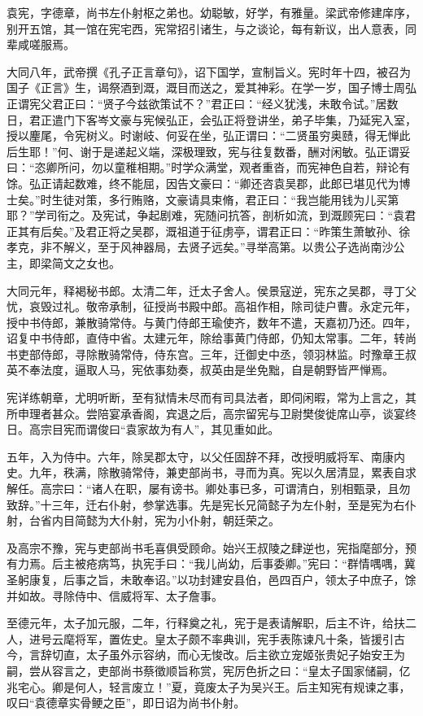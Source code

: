 \documentclass[]{article}
\begin{document}
袁宪，字德章，尚书左仆射枢之弟也。幼聪敏，好学，有雅量。梁武帝修建庠序，别开五馆，其一馆在宪宅西，宪常招引诸生，与之谈论，每有新议，出人意表，同辈咸嗟服焉。

大同八年，武帝撰《孔子正言章句》，诏下国学，宣制旨义。宪时年十四，被召为国子《正言》生，谒祭酒到溉，溉目而送之，爱其神彩。在学一岁，国子博士周弘正谓宪父君正曰：``贤子今兹欲策试不？''君正曰：``经义犹浅，未敢令试。''居数日，君正遣门下客岑文豪与宪候弘正，会弘正将登讲坐，弟子毕集，乃延宪入室，授以麈尾，令宪树义。时谢岐、何妥在坐，弘正谓曰：``二贤虽穷奥赜，得无惮此后生耶！''何、谢于是递起义端，深极理致，宪与往复数番，酬对闲敏。弘正谓妥曰：``恣卿所问，勿以童稚相期。''时学众满堂，观者重沓，而宪神色自若，辩论有馀。弘正请起数难，终不能屈，因告文豪曰：``卿还咨袁吴郡，此郎已堪见代为博士矣。''时生徒对策，多行贿赂，文豪请具束脩，君正曰：``我岂能用钱为儿买第耶？''学司衔之。及宪试，争起剧难，宪随问抗答，剖析如流，到溉顾宪曰：``袁君正其有后矣。''及君正将之吴郡，溉祖道于征虏亭，谓君正曰：``昨策生萧敏孙、徐孝克，非不解义，至于风神器局，去贤子远矣。''寻举高第。以贵公子选尚南沙公主，即梁简文之女也。

大同元年，释褐秘书郎。太清二年，迁太子舍人。侯景寇逆，宪东之吴郡，寻丁父忧，哀毁过礼。敬帝承制，征授尚书殿中郎。高祖作相，除司徒户曹。永定元年，授中书侍郎，兼散骑常侍。与黄门侍郎王瑜使齐，数年不遣，天嘉初乃还。四年，诏复中书侍郎，直侍中省。太建元年，除给事黄门侍郎，仍知太常事。二年，转尚书吏部侍郎，寻除散骑常侍，侍东宫。三年，迁御史中丞，领羽林监。时豫章王叔英不奉法度，逼取人马，宪依事劾奏，叔英由是坐免黜，自是朝野皆严惮焉。

宪详练朝章，尤明听断，至有狱情未尽而有司具法者，即伺闲暇，常为上言之，其所申理者甚众。尝陪宴承香阁，宾退之后，高宗留宪与卫尉樊俊徙席山亭，谈宴终日。高宗目宪而谓俊曰``袁家故为有人''，其见重如此。

五年，入为侍中。六年，除吴郡太守，以父任固辞不拜，改授明威将军、南康内史。九年，秩满，除散骑常侍，兼吏部尚书，寻而为真。宪以久居清显，累表自求解任。高宗曰：``诸人在职，屡有谤书。卿处事已多，可谓清白，别相甄录，且勿致辞。''十三年，迁右仆射，参掌选事。先是宪长兄简懿子为左仆射，至是宪为右仆射，台省内目简懿为大仆射，宪为小仆射，朝廷荣之。

及高宗不豫，宪与吏部尚书毛喜俱受顾命。始兴王叔陵之肆逆也，宪指麾部分，预有力焉。后主被疮病笃，执宪手曰：``我儿尚幼，后事委卿。''宪曰：``群情喁喁，冀圣躬康复，后事之旨，未敢奉诏。''以功封建安县伯，邑四百户，领太子中庶子，馀并如故。寻除侍中、信威将军、太子詹事。

至德元年，太子加元服，二年，行释奠之礼，宪于是表请解职，后主不许，给扶二人，进号云麾将军，置佐史。皇太子颇不率典训，宪手表陈谏凡十条，皆援引古今，言辞切直，太子虽外示容纳，而心无悛改。后主欲立宠姬张贵妃子始安王为嗣，尝从容言之，吏部尚书蔡徵顺旨称赏，宪厉色折之曰：``皇太子国家储嗣，亿兆宅心。卿是何人，轻言废立！''夏，竟废太子为吴兴王。后主知宪有规谏之事，叹曰``袁德章实骨鲠之臣''，即日诏为尚书仆射。
\end{document}
